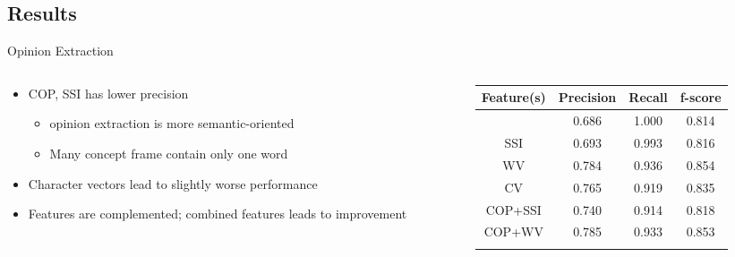 \documentclass[compress]{beamer}
\begin{document}
    \subsection{Results}
        \begin{frame}{Opinion Extraction}
            \begin{columns}
                \begin{column}[T]{.5\textwidth}
                    \begin{itemize}
                        \item<1-> COP, SSI has lower precision
                            \begin{itemize}
                                \item opinion extraction  is more semantic-oriented
                                \item Many concept frame contain only one word
                            \end{itemize}
                        \item<2-> Character vectors lead to slightly worse performance
                        \item<3-> Features are complemented; combined features leads to improvement
                    \end{itemize}
                \end{column}
                \begin{column}[T]{.6\textwidth}
                    \begin{table}
                    \small
                    \centering
                    \tabcolsep=0.1cm
                    \begin{tabular}{cccc}
                    \hline
                    Feature(s) & Precision & Recall & f-score \\ \hline
                    \only<1>{
                        COP        & \cellcolor{green}0.686     & 1.000  & 0.814   \\ \hline
                        SSI        & \cellcolor{green}0.693     & 0.993  & 0.816   \\ \hline
                        WV         & 0.784     & 0.936  & 0.854   \\ \hline
                        CV         & 0.765     & 0.919  & 0.835   \\ \hline
                        COP+SSI    & 0.740     & 0.914  & 0.818   \\ \hline
                        COP+WV     & 0.785     & 0.933  & 0.853   \\ \hline
}
\end{tabular}
\end{table}
\end{column}
\end{columns}
\end{frame}
\end{document}
